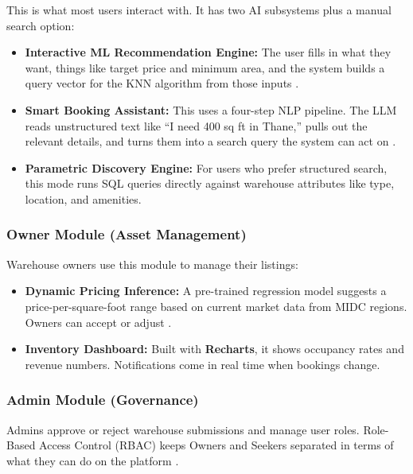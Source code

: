 \documentclass[pdflatex,sn-mathphys-num]{sn-jnl}
\theoremstyle{thmstyleone}
\theoremstyle{thmstyletwo}
\theoremstyle{thmstylethree}
\begin{document}
This is what most users interact with.
It has two AI subsystems plus a manual search option:
\begin{itemize}
    \item \textbf{Interactive ML Recommendation Engine:}
      The user fills in what they want, things like target
      price and minimum area, and the system builds a query
      vector for the KNN algorithm from those inputs
      \cite{b10}.

    \item \textbf{Smart Booking Assistant:}
      This uses a four-step NLP pipeline.
      The LLM reads unstructured text like ``I need 400 sq ft
      in Thane,'' pulls out the relevant details, and turns
      them into a search query the system can act on
      \cite{b3, b7}.

    \item \textbf{Parametric Discovery Engine:}
      For users who prefer structured search, this mode runs
      SQL queries directly against warehouse attributes like
      type, location, and amenities.
\end{itemize}

\subsubsection{Owner Module (Asset Management)}%
\label{subsubsec:owner}

Warehouse owners use this module to manage their listings:
\begin{itemize}
    \item \textbf{Dynamic Pricing Inference:}
      A pre-trained regression model suggests a
      price-per-square-foot range based on current market
      data from MIDC regions.
      Owners can accept or adjust \cite{b5}.

    \item \textbf{Inventory Dashboard:}
      Built with \textbf{Recharts}, it shows occupancy rates
      and revenue numbers.
      Notifications come in real time when bookings change.
\end{itemize}

\subsubsection{Admin Module (Governance)}%
\label{subsubsec:admin}

Admins approve or reject warehouse submissions and manage
user roles.
Role-Based Access Control (RBAC) keeps Owners and Seekers
separated in terms of what they can do on the platform
\cite{b6}.
\end{document}
